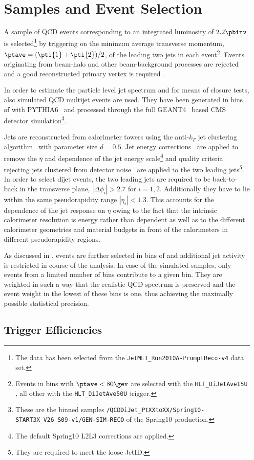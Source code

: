 \section{Samples and Event Selection}\label{sec:ResFit:EvtSel}

A sample of QCD events corresponding to an integrated luminosity of $2.2\pbinv$ is
selected\footnote{The data has been selected from the \texttt{JetMET\_Run2010A-PromptReco-v4} data set.} by triggering on the minimum average transverse momentum, \mbox{$\ptave = (\pti{1} + \pti{2})/2$}, of the leading two jets in each event\footnote{Events in bins with \mbox{$\ptave < 80\gev$} are selected with the \texttt{HLT\_DiJetAve15U} , all other with the \texttt{HLT\_DiJetAve50U} trigger.}.
Events originating from beam-halo and other beam-background processes are rejected~\cite{bib:cmspas:monster} and a good reconstructed primary vertex is required~\cite{bib:cmspas:vertex}.

In order to estimate the particle level jet \pt spectrum and for means of closure tests, also simulated QCD multijet events are used.
They have been generated in bins of \pthat with PYTHIA6~\cite{bib:pythia} and processed through the full GEANT4~\cite{bib:geant} based CMS detector simulation\footnote{These are the \pthat binned samples \texttt{/QCDDiJet\_PtXXtoXX/Spring10-START3X\_V26\_S09-v1/GEN-SIM-RECO} of the Spring10 production.}.

Jets are reconstructed from calorimeter towers using the
anti-$k_{T}$ jet clustering algorithm~\cite{bib:akj} with parameter size \mbox{$d=0.5$}.
Jet energy corrections~\cite{bib:cmspas:jec} are applied to remove the 
$\eta$ and \pt dependence of the jet energy scale\footnote{The default Spring10 L2L3 corrections are applied.} and quality criteria rejecting jets clustered from detector noise~\cite{bib:cmspas:jetid} are applied to the
two leading jets\footnote{They are required to meet the loose JetID.}.
In order to select dijet events, the two leading jets are required to be
back-to-back in the transverse plane, \mbox{$|\Delta\phi_{i}| > 2.7$} for \mbox{$i=1,2$}.
Additionally they have to lie within the same pseudorapidity range \mbox{$|\eta_{i}| < 1.3$}.
This accounts for the dependence of the jet \pt response on $\eta$ owing to the fact that the intrinsic calorimeter resolution is energy rather than \pt dependent as well as to the different calorimeter geometries and material budgets in front of the calorimeters in different pseudorapidity regions.

As discussed in , events are further selected in bins of \ptave and additional
jet activity is restricted in course of the analysis.
In case of the simulated samples, only events from a limited number of \pthat bins contribute to a given \ptave bin.
They are weighted in such a way that the realistic QCD \pt spectrum is preserved and the event weight in the lowest of these \pthat bins is one, thus achieving the maximally possible statistical precision.


\subsection{Trigger Efficiencies}
